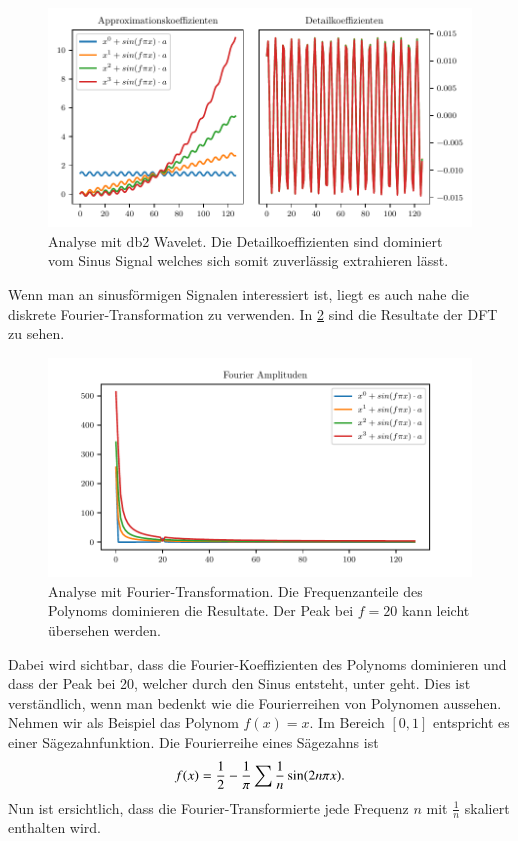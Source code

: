 \begin{refsection}
\begin{figure}
    \centering
    \includegraphics{papers/polynomials/images/polynomials_sin_db2.pdf}
    \caption{Analyse mit db2 Wavelet. Die Detailkoeffizienten sind dominiert
             vom Sinus Signal welches sich somit zuverlässig extrahieren
             lässt.\label{polynomials:sin:db2}}
\end{figure}

Wenn man an sinusförmigen Signalen interessiert ist, liegt es auch nahe die
diskrete Fourier-Transformation zu verwenden. In \cref{polynomials:sin:fft}
sind die Resultate der DFT zu sehen.
\begin{figure}
    \centering
    \includegraphics{papers/polynomials/images/polynomials_sin_fft.pdf}
    \caption{Analyse mit Fourier-Transformation. Die Frequenzanteile des
             Polynoms dominieren die Resultate. Der Peak bei $f=20$ kann leicht
             übersehen werden.\label{polynomials:sin:fft}}
\end{figure}
Dabei wird sichtbar, dass die Fourier-Koeffizienten des Polynoms dominieren und
dass der Peak bei 20, welcher durch den Sinus entsteht, unter geht. Dies ist
verständlich, wenn man bedenkt wie die Fourierreihen von Polynomen aussehen.
Nehmen wir als Beispiel das Polynom $f(x) = x$. Im Bereich $[0, 1]$ entspricht
es einer Sägezahnfunktion. Die Fourierreihe eines Sägezahns ist \[f(x) =
\index{Sägezahn}%
\frac{1}{2} - \frac{1}{\pi} \sum{\frac{1}{n} \sin(2 n \pi x)}.\] Nun ist
ersichtlich, dass die Fourier-Transformierte jede Frequenz $n$ mit
$\frac{1}{n}$ skaliert enthalten wird.


\end{refsection}
